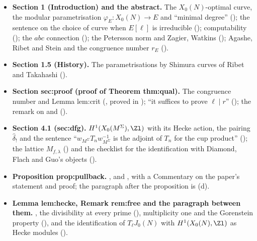 \begin{itemize}
\item \textbf{Section 1 (Introduction) and the abstract.} The $X_0(N)$-optimal curve, the modular parametrisation
$\varphi_E\colon X_0(N)\to E$ and ``minimal degree'' ();
the sentence on the choice of curve when $E[\ell]$ is irreducible (); computability
(); the $abc$ connection (); the Petersson norm and Zagier, Watkins
(); Agashe, Ribet and Stein and the congruence number $r_E$
().
\item \textbf{Section 1.5 (History).} The parametrisations by Shimura curves of Ribet and Takahashi
().
\item \textbf{Section sec:proof (proof of Theorem thm:qual).} The congruence number and Lemma lem:crit (, proved in
); ``it suffices to prove $\ell\mid r$'' (); the remark on  and 
().
\item \textbf{Section 4.1 (sec:dfg).} $H^1(X_0(M^\Sigma),\Zl)$ with its Hecke action, the pairing $\hat\delta_!$ and the sentence
``$w_{M^\Sigma}T_nw_{M^\Sigma}^{-1}$ is the adjoint of $T_n$ for the cup product'' (); the
lattice $M_{f,\lambda}$ () and the checklist for the identification with Diamond, Flach and Guo's objects
().
\item \textbf{Proposition prop:pullback.} ,  and , with a
Commentary on the paper's statement and proof; the paragraph after the proposition is (d).
\item \textbf{Lemma lem:hecke, Remark rem:free and the paragraph between them.} , the divisibility at every prime
(), multiplicity one and the Gorenstein property
(), and the identification of
$T_\ell J_0(N)$ with $H^1(X_0(N),\Zl)$ as Hecke modules ().

\end{itemize}
